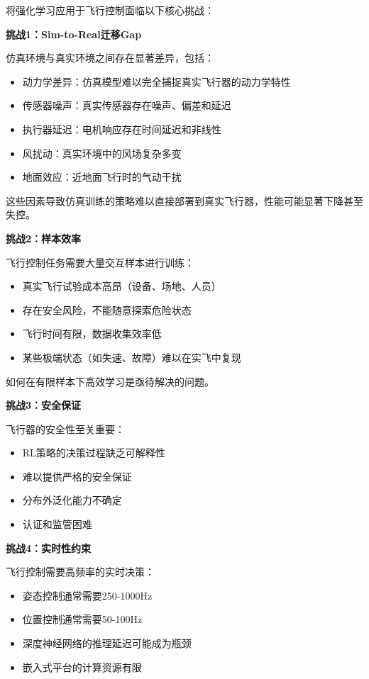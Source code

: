\documentclass[12pt,a4paper]{ctexart}
\begin{document}
将强化学习应用于飞行控制面临以下核心挑战：

\textbf{挑战1：Sim-to-Real迁移Gap}

仿真环境与真实环境之间存在显著差异，包括：
\begin{itemize}
    \item 动力学差异：仿真模型难以完全捕捉真实飞行器的动力学特性
    \item 传感器噪声：真实传感器存在噪声、偏差和延迟
    \item 执行器延迟：电机响应存在时间延迟和非线性
    \item 风扰动：真实环境中的风场复杂多变
    \item 地面效应：近地面飞行时的气动干扰
\end{itemize}

这些因素导致仿真训练的策略难以直接部署到真实飞行器，性能可能显著下降甚至失控。

\textbf{挑战2：样本效率}

飞行控制任务需要大量交互样本进行训练：
\begin{itemize}
    \item 真实飞行试验成本高昂（设备、场地、人员）
    \item 存在安全风险，不能随意探索危险状态
    \item 飞行时间有限，数据收集效率低
    \item 某些极端状态（如失速、故障）难以在实飞中复现
\end{itemize}

如何在有限样本下高效学习是亟待解决的问题。

\textbf{挑战3：安全保证}

飞行器的安全性至关重要：
\begin{itemize}
    \item RL策略的决策过程缺乏可解释性
    \item 难以提供严格的安全保证
    \item 分布外泛化能力不确定
    \item 认证和监管困难
\end{itemize}

\textbf{挑战4：实时性约束}

飞行控制需要高频率的实时决策：
\begin{itemize}
    \item 姿态控制通常需要250-1000Hz
    \item 位置控制通常需要50-100Hz
    \item 深度神经网络的推理延迟可能成为瓶颈
    \item 嵌入式平台的计算资源有限
\end{itemize}
\end{document}
